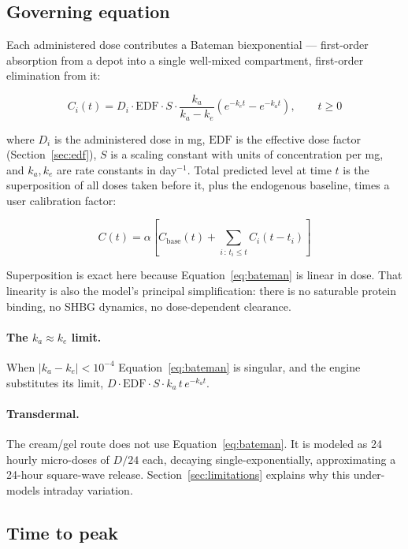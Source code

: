 \documentclass[11pt,a4paper]{article}
\begin{document}
\subsection{Governing equation}

Each administered dose contributes a Bateman biexponential --- first-order
absorption from a depot into a single well-mixed compartment, first-order
elimination from it:

\begin{equation}
C_i(t) = D_i \cdot \mathrm{EDF} \cdot S \cdot
         \frac{k_a}{k_a - k_e}\left(e^{-k_e t} - e^{-k_a t}\right),
         \qquad t \ge 0
\label{eq:bateman}
\end{equation}

where $D_i$ is the administered dose in mg, $\mathrm{EDF}$ is the effective dose
factor (Section~\ref{sec:edf}), $S$ is a scaling constant with units of
concentration per mg, and $k_a,k_e$ are rate constants in day$^{-1}$. Total
predicted level at time $t$ is the superposition of all doses taken before it,
plus the endogenous baseline, times a user calibration factor:

\begin{equation}
C(t) = \alpha\left[C_{\text{base}}(t) + \sum_{i \,:\, t_i \le t} C_i(t - t_i)\right]
\end{equation}

Superposition is exact here because Equation~\ref{eq:bateman} is linear in dose.
That linearity is also the model's principal simplification: there is no
saturable protein binding, no SHBG dynamics, no dose-dependent clearance.

\paragraph{The $k_a \approx k_e$ limit.} When $|k_a - k_e| < 10^{-4}$
Equation~\ref{eq:bateman} is singular, and the engine substitutes its limit,
$D \cdot \mathrm{EDF} \cdot S \cdot k_a\, t\, e^{-k_a t}$.

\paragraph{Transdermal.} The cream/gel route does not use
Equation~\ref{eq:bateman}. It is modeled as 24 hourly micro-doses of
$D/24$ each, decaying single-exponentially, approximating a 24-hour square-wave
release. Section~\ref{sec:limitations} explains why this under-models intraday
variation.

\subsection{Time to peak}
\end{document}
